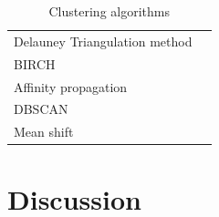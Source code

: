 \begin{table}[h]
\begin{tabular}{p{}p{}}
        Delauney Triangulation method 		& \cite{xml_dft_delaunay_traingulation} \\
        BIRCH 								& \cite{svd_birch_tsc_stock_price, auto_encoder_many_tsc_algorithms, } \\
        Affinity propagation  				& \cite{auto_encoder_many_tsc_algorithms} \\
        DBSCAN  							& \cite{auto_encoder_many_tsc_algorithms} \\
        Mean shift  						& \cite{auto_encoder_many_tsc_algorithms} \\
        \bottomrule
    \end{tabular}
    \caption{Clustering algorithms}
    \label{tab:clust_alg}
\end{table}

\section{Discussion}
